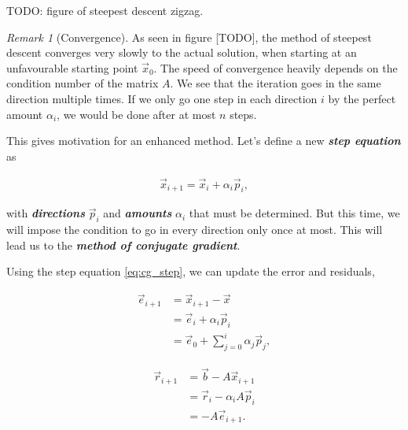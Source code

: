 \documentclass{article}
\theoremstyle{plain} %
\theoremstyle{convention} %
\theoremstyle{remark} %
\newtheorem*{remark}{Remark} %
\def\df#1{\textbf{\textit{#1}}}
\numberwithin{equation}{section}
\begin{document}
TODO: figure of steepest descent zigzag.

\begin{remark}[Convergence]
As seen in figure [TODO], the method of steepest descent converges very slowly to the actual solution, when starting at an unfavourable starting point $\vec{x}_0$. The speed of convergence heavily depends on the condition number of the matrix $A$. We see that the iteration goes in the same direction multiple times. If we only go one step in each direction $i$ by the perfect amount $\alpha_i$, we would be done after at most $n$ steps.
\end{remark}

This gives motivation for an enhanced method. Let's define a new \df{step equation} as

\begin{align}
    \vec{x}_{i+1} = \vec{x}_i + \alpha_i \vec{p}_i, \label{eq:cg_step}
\end{align}

with \df{directions} $\vec{p}_i$ and \df{amounts} $\alpha_i$ that must be determined. But this time, we will impose the condition to go in every direction only once at most. This will lead us to the \df{method of conjugate gradient}.

Using the step equation \eqref{eq:cg_step}, we can update the error and residuals,

\begin{subequations}
    \begin{align}
        \vec{e}_{i+1} &= \vec{x}_{i+1} - \vec{x} \\
                      &= \vec{e}_{i} + \alpha_i \vec{p}_{i} \label{eq:cg_error1} \\
                      &= \vec{e}_{0} + \sum_{j=0}^{i} \alpha_j \vec{p}_{j}, \label{eq:cg_error2}
    \end{align}
\end{subequations}

\begin{subequations}
    \begin{align}
        \vec{r}_{i+1} &= \vec{b} - A \vec{x}_{i+1} \label{eq:residual_exact} \\
                      &= \vec{r}_{i} - \alpha_i A \vec{p}_{i} \label{eq:residual_recursive} \\
                      &= - A \vec{e}_{i+1}. \label{eq:residual_exact2}
    \end{align}
\end{subequations}
\end{document}
